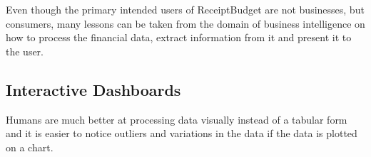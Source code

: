 Even though the primary intended users of ReceiptBudget are not businesses, but consumers, many lessons can be taken from the domain of business intelligence on how to process the financial data, extract information from it and present it to the user.  

\subsection{Interactive Dashboards}
Humans are much better at processing data visually instead of a tabular form and it is easier to notice outliers and variations in the data if the data is plotted on a chart\cite{daniel1959use}.